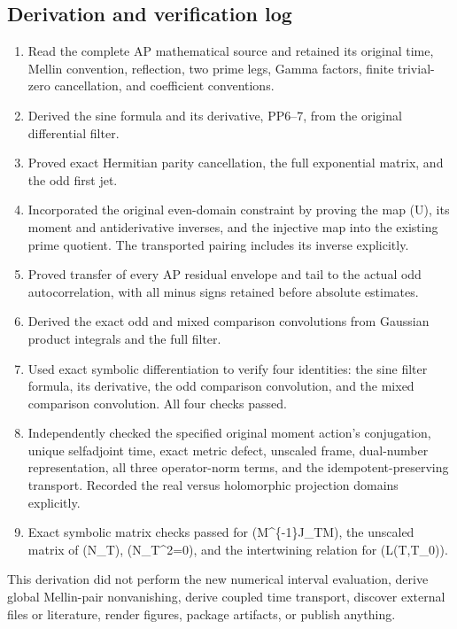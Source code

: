 \documentclass[
]{article}
\providecommand{\tightlist}{%
  \setlength{\itemsep}{0pt}\setlength{\parskip}{0pt}}
\begin{document}
\subsection{Derivation and verification
log}\label{derivation-and-verification-log}

\begin{enumerate}
\def\labelenumi{\arabic{enumi}.}
\tightlist
\item
  Read the complete AP mathematical source and retained its original
  time, Mellin convention, reflection, two prime legs, Gamma factors,
  finite trivial-zero cancellation, and coefficient conventions.
\item
  Derived the sine formula and its derivative, PP6--7, from the original
  differential filter.
\item
  Proved exact Hermitian parity cancellation, the full exponential
  matrix, and the odd first jet.
\item
  Incorporated the original even-domain constraint by proving the map
  (U), its moment and antiderivative inverses, and the injective map
  into the existing prime quotient. The transported pairing includes its
  inverse explicitly.
\item
  Proved transfer of every AP residual envelope and tail to the actual
  odd autocorrelation, with all minus signs retained before absolute
  estimates.
\item
  Derived the exact odd and mixed comparison convolutions from Gaussian
  product integrals and the full filter.
\item
  Used exact symbolic differentiation to verify four identities: the
  sine filter formula, its derivative, the odd comparison convolution,
  and the mixed comparison convolution. All four checks passed.
\item
  Independently checked the specified original moment action's
  conjugation, unique selfadjoint time, exact metric defect, unscaled
  frame, dual-number representation, all three operator-norm terms, and
  the idempotent-preserving transport. Recorded the real versus
  holomorphic projection domains explicitly.
\item
  Exact symbolic matrix checks passed for (M\^{}\{-1\}J\_TM), the
  unscaled matrix of (N\_T), (N\_T\^{}2=0), and the intertwining
  relation for (L(T,T\_0)).
\end{enumerate}

This derivation did not perform the new numerical interval evaluation,
derive global Mellin-pair nonvanishing, derive coupled time transport,
discover external files or literature, render figures, package
artifacts, or publish anything.
\end{document}
